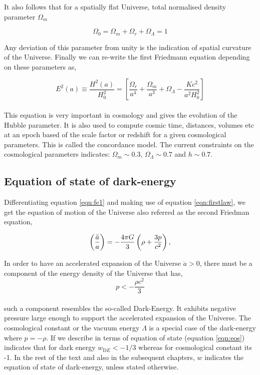 It also follows that for a spatially flat Universe, total normalised 
density parameter $\Omega_m$

\begin{equation}
	\Omega_0 = \Omega_m + \Omega_r + \Omega_{\Lambda} = 1
\end{equation}

Any deviation of this 
parameter from unity is the indication of spatial curvature of the Universe.
Finally we can re-write the first Friedmann equation depending on these parameters as,

\begin{equation}
	E^2(a) \equiv \dfrac{H^2(a)}{H_0^2} = \left[\dfrac{\Omega_r}{a^4}
	 + \dfrac{\Omega_m}{a^3} +
	 \Omega_{\Lambda} - \dfrac{Kc^2}{a^2H_0^2}  \right]
	 \label{eqn:hubbleparameter}
\end{equation}
\\
This equation is very important in cosmology and gives the evolution of the 
Hubble parameter. It is also used to compute cosmic time, distances, volumes
etc at an epoch based of the scale factor or redshift for a given cosmological
parameters. This is called the concordance model. The current constraints on the
cosmological parameters indicates: $\Omega_m \sim 0.3$, $\Omega_{\Lambda} \sim 0.7$
and $h \sim 0.7$.


\subsection{Equation of state of dark-energy}

Differentiating equation \ref{eqn:fe1} and making use of equation
\ref{eqn:firstlaw}, we get the equation of motion of the Universe
also referred as the second Friedman equation,

\begin{equation}
\centering
		\left( \dfrac{\ddot{a}}{a} \right) = -\dfrac{4 \pi G}{3} 
			\left( \rho + \dfrac{3p}{c^2} \right),
\label{eqn:fe2}
\end{equation}

In order to have an accelerated expansion of the Universe $\ddot{a}>0$,
there must be a component of the energy density of the Universe that has,
\begin{equation}
	p < -\dfrac{\rho c^2}{3} 
\end{equation}
\\
such a component resembles the so-called {Dark-Energy}. It exhibits 
negative pressure large enough to support the accelerated expansion of the
Universe. The cosmological constant or the vacuum energy $\Lambda$ is a 
special case of the dark-energy where $p=-\rho$. If we describe in terms 
of equation of state (equation \ref{eqn:eos}) indicates that for 
dark energy $w_{\mathrm DE}<-1/3$ whereas for cosmological constant its -1.
In the rest of the text and also in the subsequent chapters, $w$ indicates
the equation of state of dark-energy, unless stated otherwise.


